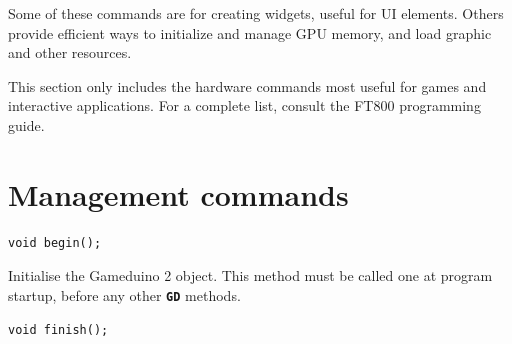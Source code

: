 \documentclass[10pt]{book}
\makeatletter
\newcommand{\gdtwo}{Gameduino 2 }
\newcommand{\mach}[1]{\texttt{\textbf{#1}}}
\newcommand{\cmdidx}[1]{
\index{#1@\mach{#1()}}
}
\newcommand{\cmd}[1]{\cmdidx{cmd\_#1}\nameref{cmd:#1}}
\makeatother
\begin{document}

Some of these commands 
are for creating widgets, useful for UI elements.
Others provide efficient ways to initialize and manage GPU memory,
and load graphic and other resources.

This section only includes the hardware commands
most useful for games and interactive applications.
For a complete list, consult the FT800 programming guide.

\newcommand{\highcmd}[2]{
\section{\texttt{cmd\_#1}}
\label{cmd:#1}
\index{cmd\_#1@\mach{cmd\_#1()}|boldindex}
}



\newcommand{\cmd}[1]{
\section{\texttt{#1}}
\label{#1}
}

\chapter{Management commands}


\begin{framed}
\begin{verbatim}
void begin();
\end{verbatim}
\end{framed}

Initialise the \gdtwo object.
This method must be called one at program startup, before any other \mach{GD} methods.


\begin{framed}
\begin{verbatim}
void finish();
\end{verbatim}
\end{framed}
\end{document}
